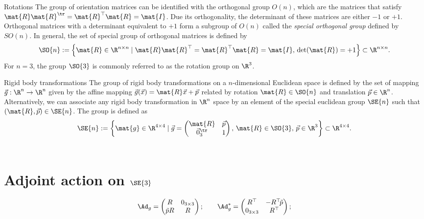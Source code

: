 
\begin{define}{Rotations} The group of orientation matrices can be identified with the orthogonal group $O(n)$, which are the matrices that satisfy $\mat{R}\mat{R}^\tr = \mat{R}^\top\mat{R} = \mat{I}$. Due its orthogonality, the determinant of these matrices are either $-1$ or $+1$. Orthogonal matrices with a determinant equivalent to $+1$ form a subgroup of $O(n)$ called the \textit{special orthogonal group} defined by $SO(n)$. In general, the set of special group of orthogonal matrices is defined by
\begin{equation}
\SO{n}:= \left\{ \mat{R}\in \R^{n \times n} \; | \; {\mat{R}} \mat{R}^\top = {\mat{R}}^\top \mat{R} = \mat{I}, \, \det(\mat{R}) = +1 \right\} \subset \R^{n\times n}.
\end{equation}
For $n = 3$, the group $\SO{3}$ is commonly referred to as the rotation group on $\R^3$.
\end{define}

\begin{define}{Rigid body transformations}  The group of rigid body transformations on a $n$-dimensional Euclidean space is defined by the set of mapping $\vec{g}: \R^n \to \R^n$ given by the affine mapping $\vec{g} (\vec{x}) = \mat{R} \vec{x} + \vec{p}$ related by rotation $\mat{R} \in \SO{n}$ and translation $\vec{p} \in \R^n$. Alternatively, we can associate any rigid body transformation in $\R^n$ space by an element of the special euclidean group $\SE{n}$ such that $(\mat{R},\vec{p}) \in \SE{n}$. The group is defined as
\begin{equation}
\SE{n} := \left\{ \mat{g} \in \R^{4 \times 4} \;|\; \vec{g} = \begin{pmatrix} \mat{R} & \vec{p} \\ \vec{0}_3^\tr & 1 \end{pmatrix}, \, \mat{R} \in \SO{3},\, \vec{p} \in \R^3 \right\} \subset \R^{4\times 4}.
\end{equation}\
\end{define}

\section{Adjoint action on $\SE{3}$}

\begin{equation}
\Ad_{g} = \begin{pmatrix} R & 0_{3\times3} \\ \tilde{p} R & R\end{pmatrix}; \quad \quad \Ad_{g}^* = \begin{pmatrix} R^\top & -R^\top\! \tilde{p}   \\ 0_{3\times3} & R^\top\end{pmatrix};
\end{equation}

